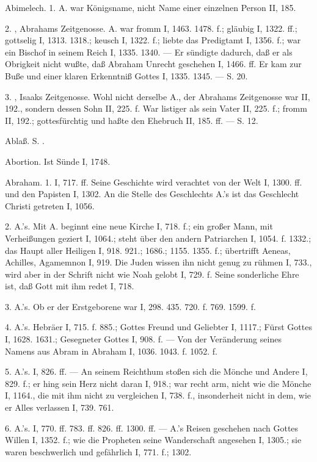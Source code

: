 Abimelech. 1. A. war Königsname, nicht Name einer einzelnen Person II, 185.

2. , Abrahams Zeitgenosse. A. war fromm I, 1463. 1478. f.; gläubig I, 1322. ff.; gottselig I, 1313. 1318.; keusch I, 1322. f.; liebte das Predigtamt I, 1356. f.; war ein Bischof in seinem Reich I, 1335. 1340. — Er sündigte dadurch, daß er als Obrigkeit nicht wußte, daß Abraham Unrecht geschehen I, 1466. ff. Er kam zur Buße und einer klaren Erkenntniß Gottes I, 1335. 1345. — S.  20.

3. , Isaaks Zeitgenosse. Wohl nicht derselbe A., der Abrahams Zeitgenosse war II, 192., sondern dessen Sohn II, 225. f. War listiger als sein Vater II, 225. f.; fromm II, 192.; gottesfürchtig und haßte den Ehebruch II, 185. ff. — S.  12.

Ablaß. S. .

Abortion. Ist Sünde I, 1748.

Abraham. 1.  I, 717. ff. Seine Geschichte wird verachtet von der Welt I, 1300. ff. und den Papisten I, 1302. An die Stelle des Geschlechts A.’s ist das Geschlecht Christi getreten I, 1056.

2.  A.’s. Mit A. beginnt eine neue Kirche I, 718. f.; ein großer Mann, mit Verheißungen geziert I, 1064.; steht über den andern Patriarchen I, 1054. f. 1332.; das Haupt aller Heiligen I, 918. 921.; 1686.; 1155. 1355. f.; übertrifft Aeneas, Achilles, Agamemnon I, 919. Die Juden wissen ihn nicht genug zu rühmen I, 733., wird aber in der Schrift nicht wie Noah gelobt I, 729. f. Seine sonderliche Ehre ist, daß Gott mit ihm redet I, 718.

3.  A.’s. Ob er der Erstgeborene war I, 298. 435. 720. f. 769. 1599. f.

4.  A.’s. Hebräer I, 715. f. 885.; Gottes Freund und Geliebter I, 1117.; Fürst Gottes I, 1628. 1631.; Gesegneter Gottes I, 908. f. — Von der Veränderung seines Namens aus Abram in Abraham I, 1036. 1043. f. 1052. f.

5.  A.’s. I, 826. ff. — An seinem Reichthum stoßen sich die Mönche und Andere I, 829. f.; er hing sein Herz nicht daran I, 918.; war recht arm, nicht wie die Mönche I, 1164., die mit ihm nicht zu vergleichen I, 738. f., insonderheit nicht in dem, wie er Alles verlassen I, 739. 761.

6.  A.’s. I, 770. ff. 783. ff. 826. ff. 1300. ff. — A.’s Reisen geschehen nach Gottes Willen I, 1352. f.; wie die Propheten seine Wanderschaft angesehen I, 1305.; sie waren beschwerlich und gefährlich I, 771. f.; 1302.

